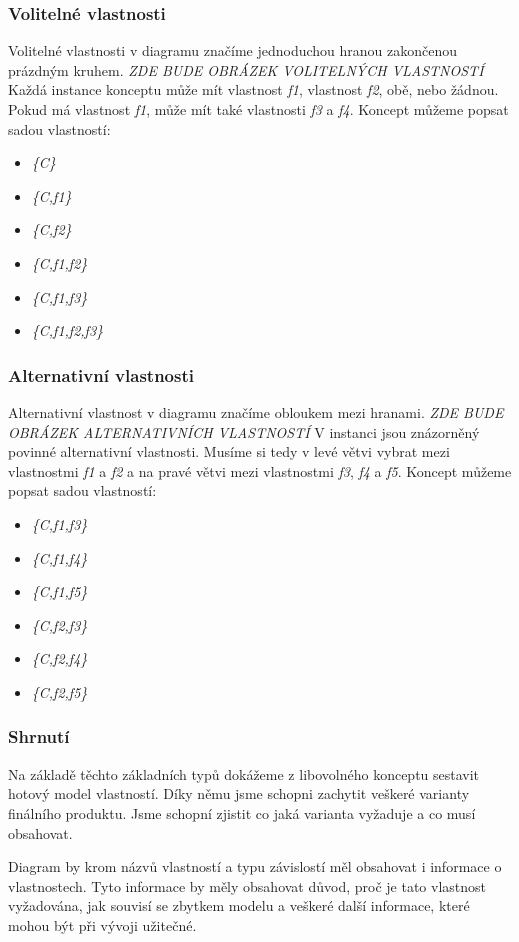 \subsubsection{Volitelné vlastnosti}
Volitelné vlastnosti v diagramu značíme jednoduchou hranou zakončenou prázdným kruhem.
\newline
\newline
\textit{ZDE BUDE OBRÁZEK VOLITELNÝCH VLASTNOSTÍ}
\newline
\newline
Každá instance konceptu může mít vlastnost \textit{f1}, vlastnost \textit{f2}, obě, nebo žádnou. Pokud má vlastnost \textit{f1}, může mít také vlastnosti \textit{f3} a \textit{f4}. Koncept můžeme popsat sadou vlastností: 
\begin{itemize}
	\item \textit{\{C\}}
	\item \textit{\{C,f1\}}
	\item \textit{\{C,f2\}}
	\item \textit{\{C,f1,f2\}}
	\item \textit{\{C,f1,f3\}}
	\item \textit{\{C,f1,f2,f3\}}
\end{itemize}

\subsubsection{Alternativní vlastnosti}
Alternativní vlastnost v diagramu značíme obloukem mezi hranami.
\newline
\newline
\textit{ZDE BUDE OBRÁZEK ALTERNATIVNÍCH VLASTNOSTÍ}
\newline
\newline
V instanci jsou znázorněný povinné alternativní vlastnosti. Musíme si tedy v levé větvi vybrat mezi vlastnostmi \textit{f1} a \textit{f2} a na pravé větvi mezi vlastnostmi \textit{f3}, \textit{f4} a \textit{f5}. Koncept můžeme popsat sadou vlastností:
\begin{itemize}
	\item \textit{\{C,f1,f3\}}
	\item \textit{\{C,f1,f4\}}
	\item \textit{\{C,f1,f5\}}
	\item \textit{\{C,f2,f3\}}
	\item \textit{\{C,f2,f4\}}
	\item \textit{\{C,f2,f5\}}
\end{itemize}

\subsubsection{Shrnutí}
Na základě těchto základních typů dokážeme z libovolného konceptu sestavit hotový model vlastností. Díky němu jsme schopni zachytit veškeré varianty finálního produktu. Jsme schopní zjistit co jaká varianta vyžaduje a co musí obsahovat. 

Diagram by krom názvů vlastností a typu závislostí měl obsahovat i informace o vlastnostech. Tyto informace by měly obsahovat důvod, proč je tato vlastnost vyžadována, jak souvisí se zbytkem modelu a veškeré další informace, které mohou být při vývoji užitečné. 